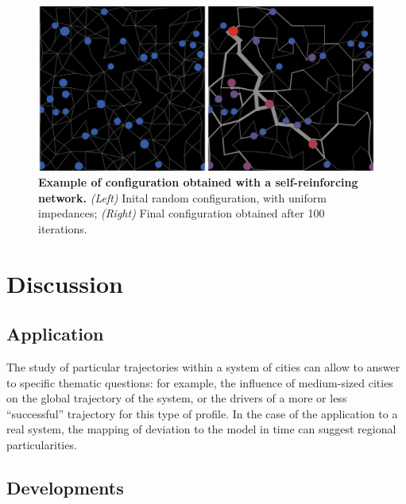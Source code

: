 \begin{figure}
	\includegraphics[width=\linewidth]{figures/6-2-3-fig-macrocoevol-slimemould}
	\caption[Example of application of the macroscopic model with a self-reinforcing network]{\textbf{Example of configuration obtained with a self-reinforcing network.} \textit{(Left)} Inital random configuration, with uniform impedances; \textit{(Right)} Final configuration obtained after 100 iterations.\label{fig:macrocoevolution:slimemould}}
\end{figure}




\section{Discussion}




\subsection{Application}


The study of particular trajectories within a system of cities can allow to answer to specific thematic questions: for example, the influence of medium-sized cities on the global trajectory of the system, or the drivers of a more or less ``successful'' trajectory for this type of profile. In the case of the application to a real system, the mapping of deviation to the model in time can suggest regional particularities.


\subsection{Developments}


